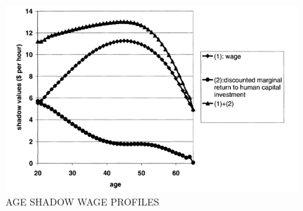\hypertarget{AgeShadow}{}
\begin{figure}[tbp]
  \centerline{\includegraphics[width=6in]{../FigDir/Figure7.png}}
  \caption{AGE SHADOW WAGE PROFILES}
  \label{fig:AgeShadow}
\end{figure}
